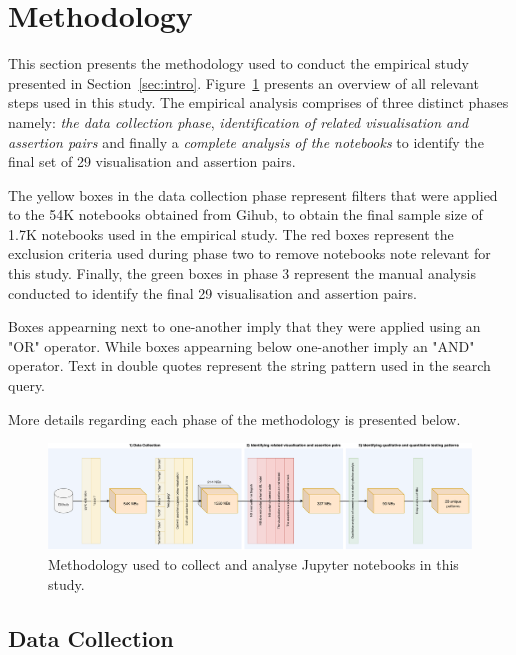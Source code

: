 \documentclass[acmsmall,screen,review,anonymous]{acmart}
\begin{document}
\section{Methodology}\label{sec:method}

This section presents the methodology used to conduct the empirical
study presented in Section~\ref{sec:intro}. Figure~\ref{fig:method}
presents an overview of all relevant steps used in this study. The
empirical analysis comprises of three distinct phases namely:
\textit{the data collection phase}, \textit{identification of related
visualisation and assertion pairs} and finally a \textit{complete
analysis of the notebooks} to identify the final set of 29
visualisation and assertion pairs.

The yellow boxes in the data collection phase represent filters that
were applied to the 54K notebooks obtained from Gihub, to obtain the
final sample size of 1.7K notebooks used in the empirical study. The red
boxes represent the exclusion criteria used during phase two to remove
notebooks note relevant for this study. Finally, the green boxes in
phase 3 represent the manual analysis conducted to identify the final 29
visualisation and assertion pairs.

Boxes appearning next to one-another imply that they were applied
using an "OR" operator. While boxes appearning below one-another imply
an "AND" operator. Text in double quotes represent the string pattern
used in the search query.

More details regarding each phase of the methodology is presented below.

\begin{figure}
  \centering
  \includegraphics[width=\textwidth]{method.pdf}
  \caption{Methodology used to collect and analyse Jupyter notebooks
    in this study.}
  \label{fig:method}
\end{figure}

\subsection{Data Collection}\label{sec:data-collect}
\end{document}
